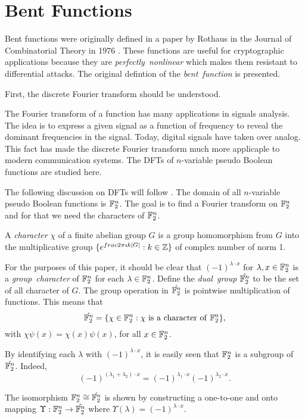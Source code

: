 \section{Bent Functions}
\par Bent functions were originally defined in a paper by Rothaus in the Journal
of Combinatorial Theory in 1976 \cite{art:r76}. These functions are useful for
cryptographic applications because they are {\em perfectly\ nonlinear} which
makes them resistant to differential attacks. The original defintion of the
{\em bent\ function} is presented.

\par First, the discrete Fourier transform should be understood.

\par The Fourier transform of a function has many applications in signals analysis.
The idea is to express a given signal as a function of frequency to reveal the dominant
frequencies in the signal. Today, digital signals have taken over analog. This fact has
made the discrete Fourier transform much more applicaple to modern communication
systems. The DFTs of $n$-variable pseudo Boolean functions are studied here.

\par The following discussion on DFTs will follow \cite{bk:t99}. The domain of all
$n$-variable pseudo Boolean functions is $\mathbb{F}_2^n$. The goal is to find a Fourier transform
on $\mathbb{F}_2^n$ and for that we need the characters of $\mathbb{F}_2^n$.

\begin{definition}\cite{bk:t99}
	A {\em character} $\chi$ of a finite abelian group $G$ is a group homomorphism
	from $G$ into the multiplicative group $\{e^{frac{2\pi\imath k}{\lvert G \rvert}}:k\in\mathbb{Z}\}$
	of complex number of norm 1.
\end{definition}

For the purposes of this paper, it should be clear that $(-1)^{\lambda\cdot x}$ for
$\lambda,x\in\mathbb{F}_2^n$ is a {\em group\ character} of $\mathbb{F}_2^n$ for each $\lambda\in\mathbb{F}_2^n$.
Define the {\em dual\ group} $\hat{\mathbb{F}_2^n}$ to be the set of all character of $G$. The group
operation in $\hat{\mathbb{F}_2^n}$ is pointwise multiplication of functions. This means that
\[
\hat{\gftwo^n}=\{\chi\in\gftwo^n:\chi\ {\rm is\ a\ character\ of\ \gftwo^n}\},
\]
with $\chi\psi(x)=\chi(x)\psi(x)$, for all $x\in\mathbb{F}_2^n$.
\par By identifying each $\lambda$ with $(-1)^{\lambda\cdot x}$, it is easily seen that $\mathbb{F}_2^n$
is a subgroup of $\hat{\mathbb{F}_2^n}$. Indeed,
\[
(-1)^{(\lambda_1+\lambda_2)\cdot x}=(-1)^{\lambda_1\cdot x}(-1)^{\lambda_2\cdot x}.
\]
\par The isomorphism $\mathbb{F}_2^n\cong\hat{\mathbb{F}_2^n}$ is shown by constructing a one-to-one
and onto mapping $\Upsilon:\mathbb{F}_2^n\rightarrow\hat{\mathbb{F}_2^n}$ where
$\Upsilon(\lambda)=(-1)^{\lambda\cdot x}$.

